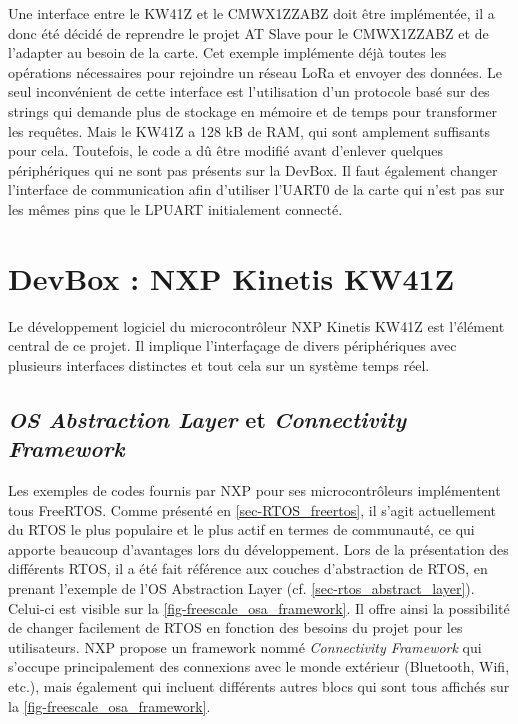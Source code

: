 Une interface entre le KW41Z et le CMWX1ZZABZ doit être implémentée, il a donc été décidé de reprendre le projet AT Slave pour le CMWX1ZZABZ et de l'adapter au besoin de la carte. Cet exemple implémente déjà toutes les opérations nécessaires pour rejoindre un réseau LoRa et envoyer des données. Le seul inconvénient de cette interface est l'utilisation d'un protocole basé sur des strings qui demande plus de stockage en mémoire et de temps pour transformer les requêtes. Mais le KW41Z a 128 kB de RAM, qui sont amplement suffisants pour cela. Toutefois, le code a dû être modifié avant d'enlever quelques périphériques qui ne sont pas présents sur la DevBox. Il faut également changer l'interface de communication afin d'utiliser l'UART0 de la carte qui n'est pas sur les mêmes pins que le LPUART initialement connecté.



\section{DevBox : NXP Kinetis KW41Z}

Le développement logiciel du microcontrôleur NXP Kinetis KW41Z est l'élément central de ce projet. Il implique l'interfaçage de divers périphériques avec plusieurs interfaces distinctes et tout cela sur un système temps réel.  

\subsection{\textit{OS Abstraction Layer} et \textit{Connectivity Framework}}

Les exemples de codes fournis par NXP pour ses microcontrôleurs implémentent tous FreeRTOS. Comme présenté en \cref{sec-RTOS_freertos}, il s'agit actuellement du RTOS le plus populaire et le plus actif en termes de communauté, ce qui apporte beaucoup d'avantages lors du développement. Lors de la présentation des différents RTOS, il a été fait référence aux couches d'abstraction de RTOS, en prenant l'exemple de l’OS Abstraction Layer (cf. \cref{sec-rtos_abstract_layer}). Celui-ci est visible sur la \cref{fig-freescale_osa_framework}. Il offre ainsi la possibilité de changer facilement de RTOS en fonction des besoins du projet pour les utilisateurs. NXP propose un framework nommé \textit{Connectivity Framework} qui s'occupe principalement des connexions avec le monde extérieur (Bluetooth, Wifi, etc.), mais également qui incluent différents autres blocs qui sont tous affichés sur la \cref{fig-freescale_osa_framework}. 

